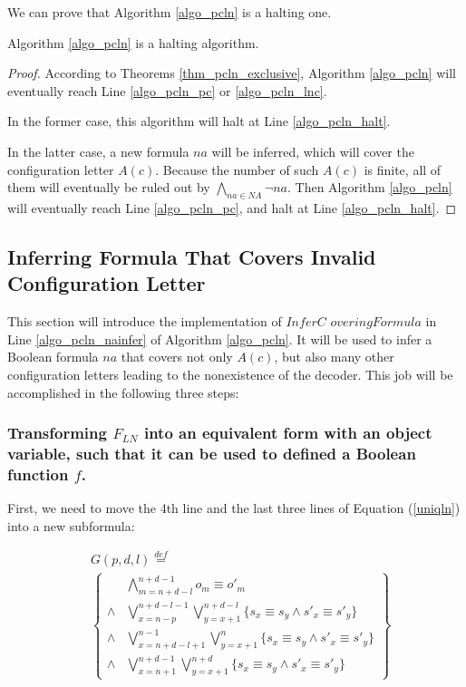 \documentclass[journal]{IEEEtran}
\begin{document}
We can prove that Algorithm \ref{algo_pcln} is a halting one.
\begin{theorem}\label{thm_pcln_halt}
Algorithm \ref{algo_pcln} is a halting algorithm.
\end{theorem}
\begin{proof}
According to Theorems \ref{thm_pcln_exclusive},
Algorithm \ref{algo_pcln} will eventually reach Line \ref{algo_pcln_pc} or \ref{algo_pcln_lnc}.

In the former case,
this algorithm will halt at Line \ref{algo_pcln_halt}.

In the latter case,
a new formula $na$ will be inferred,
which will cover the configuration letter $A(c)$.
Because the number of such $A(c)$ is finite,
all of them will eventually be ruled out by $\bigwedge_{na\in NA}\neg na$.
Then Algorithm \ref{algo_pcln} will eventually reach Line \ref{algo_pcln_pc},
and halt at Line \ref{algo_pcln_halt}.
\end{proof}

\subsection{Inferring Formula That Covers Invalid Configuration Letter}\label{subsec_infer}
This section will introduce the implementation of $InferC$ $overingFormula$ in Line \ref{algo_pcln_nainfer} of Algorithm \ref{algo_pcln}.
It will be used to infer a Boolean formula $na$
that covers not only $A(c)$,
but also many other configuration letters leading to the nonexistence of the decoder.
This job will be accomplished in the following three steps:

\subsubsection{\textbf{Transforming $F_{LN}$ into an equivalent form with an object variable, such that it can be used to defined a Boolean function $f$.}}
First,
we need to move the 4th line and the last three lines of Equation (\ref{uniqln}) into a new subformula:

\begin{equation}\label{uniqln_subg}
\begin{split}
&G(p,d,l)\stackrel{def}{=}\\
&\left\{
\begin{array}{cc}
&\bigwedge_{m=n+d-l}^{n+d-1}o_m\equiv o'_m \\
\wedge& \bigvee_{x=n-p}^{n+d-l-1}\bigvee_{y=x+1}^{n+d-l} \{s_x\equiv s_y\wedge s'_x\equiv s'_y\} \\
\wedge& \bigvee_{x=n+d-l+1}^{n-1}\bigvee_{y=x+1}^{n} \{s_x\equiv s_y\wedge s'_x\equiv s'_y\} \\
\wedge& \bigvee_{x=n+1}^{n+d-1}\bigvee_{y=x+1}^{n+d} \{s_x\equiv s_y\wedge s'_x\equiv s'_y\}
\end{array}
\right\}
\end{split}
\end{equation}
\end{document}
